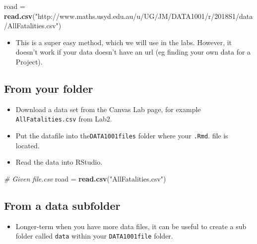 \documentclass[]{article}
\newenvironment{Shaded}{\begin{snugshade}}{\end{snugshade}}
\newcommand{\CommentTok}[1]{\textcolor[rgb]{0.56,0.35,0.01}{\textit{#1}}}
\newcommand{\KeywordTok}[1]{\textcolor[rgb]{0.13,0.29,0.53}{\textbf{#1}}}
\newcommand{\NormalTok}[1]{#1}
\newcommand{\StringTok}[1]{\textcolor[rgb]{0.31,0.60,0.02}{#1}}
\providecommand{\tightlist}{%
  \setlength{\itemsep}{0pt}\setlength{\parskip}{0pt}}
\begin{document}
\begin{Shaded}
\begin{Highlighting}[]
\NormalTok{road =}\StringTok{ }\KeywordTok{read.csv}\NormalTok{(}\StringTok{"http://www.maths.usyd.edu.au/u/UG/JM/DATA1001/r/2018S1/data/AllFatalities.csv"}\NormalTok{)}
\end{Highlighting}
\end{Shaded}

\begin{itemize}
\tightlist
\item
  This is a super easy method, which we will use in the labs. However, it doesn't work if your data doesn't have an url (eg finding your own data for a Project).
\end{itemize}

\hypertarget{from-your-folder}{%
\subsection{From your folder}\label{from-your-folder}}

\begin{itemize}
\item
  Download a data set from the Canvas Lab page, for example \texttt{AllFatalities.csv} from Lab2.
\item
  Put the datafile into the\texttt{DATA1001files} folder where your \texttt{.Rmd}. file is located.
\end{itemize}

\begin{itemize}
\tightlist
\item
  Read the data into RStudio.
\end{itemize}

\begin{Shaded}
\begin{Highlighting}[]
\CommentTok{# Given file.csv}
\NormalTok{road =}\StringTok{ }\KeywordTok{read.csv}\NormalTok{(}\StringTok{"AllFatalities.csv"}\NormalTok{)}
\end{Highlighting}
\end{Shaded}

\hypertarget{from-a-data-subfolder}{%
\subsection{From a data subfolder}\label{from-a-data-subfolder}}

\begin{itemize}
\tightlist
\item
  Longer-term when you have more data files, it can be useful to create a sub folder called \texttt{data} within your \texttt{DATA1001file} folder.
\end{itemize}
\end{document}

